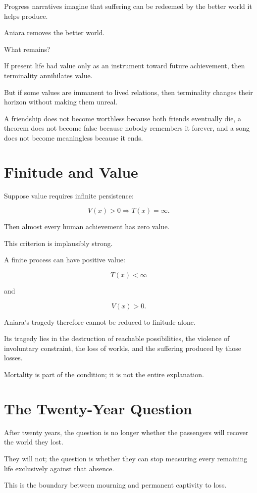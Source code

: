 \documentclass[11pt,oneside]{book}
\theoremstyle{definition}
\theoremstyle{remark}
\begin{document}
Progress narratives imagine that suffering can be redeemed by the better world it helps produce.

Aniara removes the better world.

What remains?

If present life had value only as an instrument toward future achievement, then terminality annihilates value.

But if some values are immanent to lived relations, then terminality changes their horizon without making them unreal.

A friendship does not become worthless because both friends eventually die, a theorem does not become false because nobody remembers it forever, and a song does not become meaningless because it ends.

\section{Finitude and Value}

Suppose value requires infinite persistence:

\[
V(x)>0
\Rightarrow
T(x)=\infty.
\]

Then almost every human achievement has zero value.

This criterion is implausibly strong.

A finite process can have positive value:

\[
T(x)<\infty
\]

and

\[
V(x)>0.
\]

Aniara's tragedy therefore cannot be reduced to finitude alone.

Its tragedy lies in the destruction of reachable possibilities, the violence of involuntary constraint, the loss of worlds, and the suffering produced by those losses.

Mortality is part of the condition; it is not the entire explanation.

\section{The Twenty-Year Question}

After twenty years, the question is no longer whether the passengers will recover the world they lost.

They will not; the question is whether they can stop measuring every remaining life exclusively against that absence.

This is the boundary between mourning and permanent captivity to loss.
\end{document}
